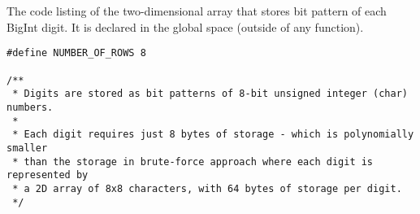 \documentclass{article}
\begin{document}
	
\paragraph{}\
\paragraph{}\
\paragraph{}\
\paragraph{}\
\paragraph{}\
\paragraph{}\
\paragraph{}\
\paragraph{}\
\paragraph{}\
\paragraph{}\
\paragraph{}\
\paragraph{}\

	
	\noindent The code listing of the two-dimensional array that stores bit pattern of each BigInt digit. It is declared in the global space (outside of any function).
	
	\begin{verbatim}
#define NUMBER_OF_ROWS 8

/**
 * Digits are stored as bit patterns of 8-bit unsigned integer (char) numbers.
 *
 * Each digit requires just 8 bytes of storage - which is polynomially smaller
 * than the storage in brute-force approach where each digit is represented by
 * a 2D array of 8x8 characters, with 64 bytes of storage per digit.
 */
	\end{verbatim}
	
\end{document}
